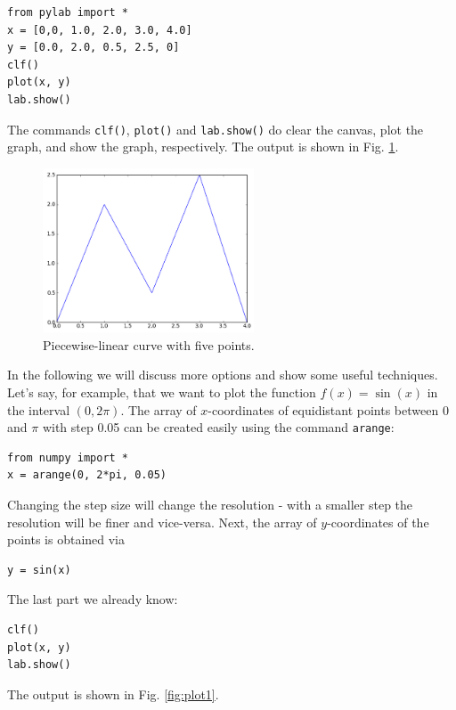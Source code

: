 \documentclass{article}
\begin{document}
\begin{verbatim}
from pylab import *
x = [0,0, 1.0, 2.0, 3.0, 4.0]
y = [0.0, 2.0, 0.5, 2.5, 0]
clf()
plot(x, y)
lab.show()
\end{verbatim}
The commands {\tt clf()}, {\tt plot()} and {\tt lab.show()} do clear the canvas, 
plot the graph, and show the graph, respectively.
The output is shown in Fig. \ref{fig:plot}.
\newpage

\begin{figure}[!ht]
\begin{center}
\hbox{}
\hspace{-6mm}
\includegraphics[width=0.56\textwidth]{img/plot.png}
\end{center}
\vspace{-2mm}
\caption{Piecewise-linear curve with five points.}
\label{fig:plot}
\end{figure}
\noindent
In the following we will discuss more options and show some useful techniques.
Let's say, for example, that we want to plot the function $f(x) = \sin(x)$
in the interval $(0, 2\pi)$. The array of $x$-coordinates of equidistant points 
between 0 and $\pi$ with step 0.05 can be created easily using the command {\tt arange}:

\begin{verbatim}
from numpy import *
x = arange(0, 2*pi, 0.05)
\end{verbatim}
Changing the step size will change the resolution - with a smaller step the resolution will 
be finer and vice-versa. Next, the array of $y$-coordinates of the points is obtained via

\begin{verbatim}
y = sin(x)
\end{verbatim}
The last part we already know:

\begin{verbatim}
clf()
plot(x, y)
lab.show()
\end{verbatim}
\noindent
The output is shown in Fig. \ref{fig:plot1}.
\newpage
\end{document}
